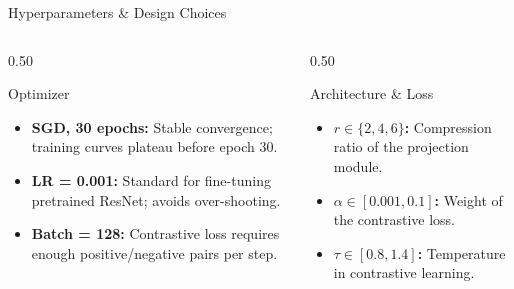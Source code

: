 \documentclass[t, aspectratio=169]{beamer} %
\begin{document}
	\begin{frame}{Hyperparameters \& Design Choices}
		\begin{columns}[T]
			\begin{column}{0.50\textwidth}
				\begin{block}{Optimizer}
					\begin{itemize}
						\item \textbf{SGD, 30 epochs:} Stable convergence; training curves plateau before epoch 30.
						\item \textbf{LR = 0.001:} Standard for fine-tuning pretrained ResNet; avoids over-shooting.
						\item \textbf{Batch = 128:} Contrastive loss requires enough positive/negative pairs per step.
					\end{itemize}
				\end{block}
			\end{column}
			\begin{column}{0.50\textwidth}
				\begin{alertblock}{Architecture \& Loss}
    \begin{itemize}
        \item \textbf{$r \in \{2,4,6\}$:} Compression ratio of the projection module.
        \item \textbf{$\alpha \in [0.001,0.1]$:} Weight of the contrastive loss.
        \item \textbf{$\tau \in [0.8,1.4]$:} Temperature in contrastive learning.
    \end{itemize}
\end{alertblock}
			\end{column}
		\end{columns}
	\end{frame}
\end{document}
